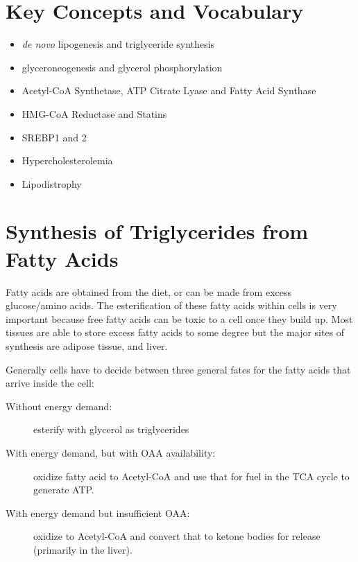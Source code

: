 \documentclass{tufte-handout}
\begin{document}
\section{Key Concepts and Vocabulary}
\begin{itemize}
\item \textit{de novo} lipogenesis and triglyceride synthesis
\item glyceroneogenesis and glycerol phosphorylation
\item Acetyl-CoA Synthetase, ATP Citrate Lyase and Fatty Acid Synthase
\item HMG-CoA Reductase and Statins
\item SREBP1 and 2
\item Hypercholesterolemia
\item Lipodistrophy

\end{itemize}

\section{Synthesis of Triglycerides from Fatty Acids}

Fatty acids are obtained from the diet, or can be made from excess glucose/amino acids.  The esterification of these fatty acids within cells is very important because free fatty acids can be toxic to a cell once they build up.  Most tissues are able to store excess fatty acids to some degree but the major sites of synthesis are adipose tissue, and liver.

Generally cells have to decide between three general fates for the fatty acids that arrive inside the cell:
\begin{description}
\item [Without energy demand:] esterify with glycerol as triglycerides
\item [With energy demand, but with OAA availability:] oxidize fatty acid to Acetyl-CoA and use that for fuel in the TCA cycle to generate ATP.
\item [With energy demand but insufficient OAA:] oxidize to Acetyl-CoA and convert that to ketone bodies for release (primarily in the liver).
\end{description}
\end{document}
